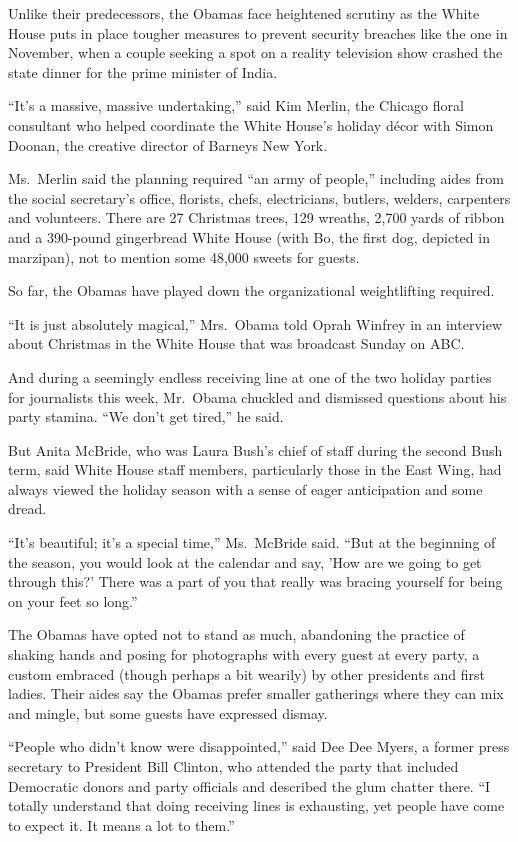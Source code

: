 ﻿\documentclass[12pt]{article}
\begin{document}
Unlike their predecessors, the Obamas face heightened scrutiny as the White House puts in place
tougher measures to prevent security breaches like the one in November, when a couple seeking a spot
on a reality television show crashed the state dinner for the prime minister of India.

``It's a massive, massive undertaking,'' said Kim Merlin, the Chicago floral consultant who helped
coordinate the White House's holiday d\'ecor with Simon Doonan, the creative director of Barneys New
York.

Ms.~Merlin said the planning required ``an army of people,'' including aides from the social
secretary's office, florists, chefs, electricians, butlers, welders, carpenters and volunteers.
There are 27 Christmas trees, 129 wreaths, 2,700 yards of ribbon and a 390-pound gingerbread White
House (with Bo, the first dog, depicted in marzipan), not to mention some 48,000 sweets for guests.

So far, the Obamas have played down the organizational weightlifting required.

``It is just absolutely magical,'' Mrs.~Obama told Oprah Winfrey in an interview about Christmas in
the White House that was broadcast Sunday on ABC.

And during a seemingly endless receiving line at one of the two holiday parties for journalists this
week, Mr.~Obama chuckled and dismissed questions about his party stamina. ``We don't get tired,'' he
said.

But Anita McBride, who was Laura Bush's chief of staff during the second Bush term, said White House
staff members, particularly those in the East Wing, had always viewed the holiday season with a
sense of eager anticipation and some dread.

``It's beautiful; it's a special time,'' Ms.~McBride said. ``But at the beginning of the season, you
would look at the calendar and say, 'How are we going to get through this?' There was a part of you
that really was bracing yourself for being on your feet so long.''

The Obamas have opted not to stand as much, abandoning the practice of shaking hands and posing for
photographs with every guest at every party, a custom embraced (though perhaps a bit wearily) by
other presidents and first ladies. Their aides say the Obamas prefer smaller gatherings where they
can mix and mingle, but some guests have expressed dismay.

``People who didn't know were disappointed,'' said Dee Dee Myers, a former press secretary to
President Bill Clinton, who attended the party that included Democratic donors and party officials
and described the glum chatter there. ``I totally understand that doing receiving lines is
exhausting, yet people have come to expect it. It means a lot to them.''
\end{document}
